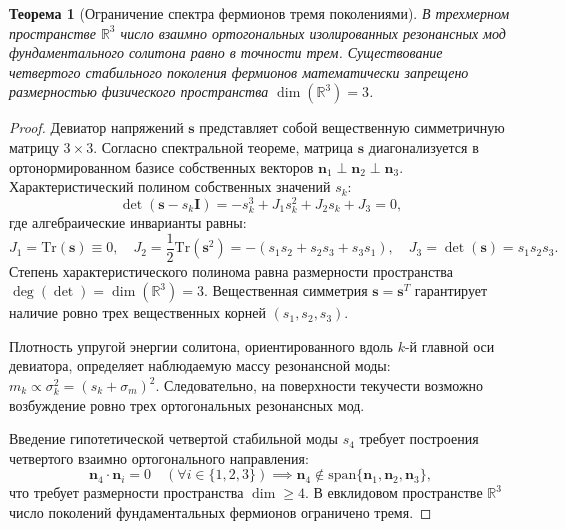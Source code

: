 \documentclass[11pt,a4paper]{article}
\newtheorem{theorem}{Теорема}[section]
\theoremstyle{definition}
\theoremstyle{remark}
\begin{document}
\begin{theorem}[Ограничение спектра фермионов тремя поколениями]
В трехмерном пространстве $\mathbb{R}^3$ число взаимно ортогональных изолированных резонансных мод фундаментального солитона равно в точности трем. Существование четвертого стабильного поколения фермионов математически запрещено размерностью физического пространства $\dim(\mathbb{R}^3) = 3$.
\end{theorem}

\begin{proof}
Девиатор напряжений $\mathbf{s}$ представляет собой вещественную симметричную матрицу $3 \times 3$. Согласно спектральной теореме, матрица $\mathbf{s}$ диагонализуется в ортонормированном базисе собственных векторов $\mathbf{n}_1 \perp \mathbf{n}_2 \perp \mathbf{n}_3$. Характеристический полином собственных значений $s_k$:
\begin{equation}
    \det(\mathbf{s} - s_k \mathbf{I}) = -s_k^3 + J_1 s_k^2 + J_2 s_k + J_3 = 0,
\end{equation}
где алгебраические инварианты равны:
\begin{equation}
    J_1 = \mathrm{Tr}(\mathbf{s}) \equiv 0, \quad J_2 = \frac{1}{2}\mathrm{Tr}(\mathbf{s}^2) = -(s_1 s_2 + s_2 s_3 + s_3 s_1), \quad J_3 = \det(\mathbf{s}) = s_1 s_2 s_3.
\end{equation}
Степень характеристического полинома равна размерности пространства $\deg(\det) = \dim(\mathbb{R}^3) = 3$. Вещественная симметрия $\mathbf{s} = \mathbf{s}^T$ гарантирует наличие ровно трех вещественных корней $(s_1, s_2, s_3)$. 

Плотность упругой энергии солитона, ориентированного вдоль $k$-й главной оси девиатора, определяет наблюдаемую массу резонансной моды: $m_k \propto \sigma_k^2 = (s_k + \sigma_m)^2$. Следовательно, на поверхности текучести возможно возбуждение ровно трех ортогональных резонансных мод. 

Введение гипотетической четвертой стабильной моды $s_4$ требует построения четвертого взаимно ортогонального направления:
\begin{equation}
    \mathbf{n}_4 \cdot \mathbf{n}_i = 0 \quad (\forall i \in \{1, 2, 3\}) \implies \mathbf{n}_4 \notin \mathrm{span}\{\mathbf{n}_1, \mathbf{n}_2, \mathbf{n}_3\},
\end{equation}
что требует размерности пространства $\dim \ge 4$. В евклидовом пространстве $\mathbb{R}^3$ число поколений фундаментальных фермионов ограничено тремя.
\end{proof}
\end{document}
